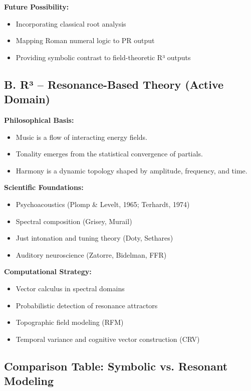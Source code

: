 \textbf{Future Possibility:}

\begin{itemize}
    \item Incorporating classical root analysis
    \item Mapping Roman numeral logic to PR output
    \item Providing symbolic contrast to field-theoretic R³ outputs
\end{itemize}

\subsection*{B. R³ – Resonance-Based Theory (Active Domain)}

\textbf{Philosophical Basis:}
\begin{itemize}
    \item Music is a flow of interacting energy fields.
    \item Tonality emerges from the statistical convergence of partials.
    \item Harmony is a dynamic topology shaped by amplitude, frequency, and time.
\end{itemize}

\textbf{Scientific Foundations:}
\begin{itemize}
    \item Psychoacoustics (Plomp \& Levelt, 1965; Terhardt, 1974)
    \item Spectral composition (Grisey, Murail)
    \item Just intonation and tuning theory (Doty, Sethares)
    \item Auditory neuroscience (Zatorre, Bidelman, FFR)
\end{itemize}

\textbf{Computational Strategy:}
\begin{itemize}
    \item Vector calculus in spectral domains
    \item Probabilistic detection of resonance attractors
    \item Topographic field modeling (RFM)
    \item Temporal variance and cognitive vector construction (CRV)
\end{itemize}

\subsection*{Comparison Table: Symbolic vs. Resonant Modeling}

